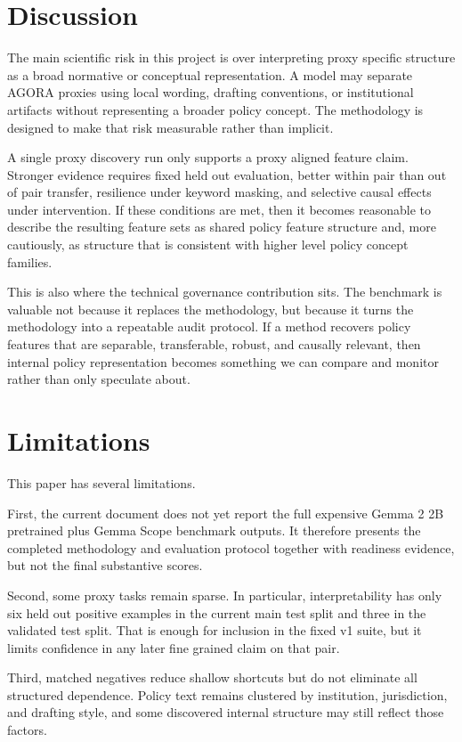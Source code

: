 ﻿\documentclass{article}
\begin{document}
\section{Discussion}
The main scientific risk in this project is over interpreting proxy specific structure as a broad normative or conceptual representation. A model may separate AGORA proxies using local wording, drafting conventions, or institutional artifacts without representing a broader policy concept. The methodology is designed to make that risk measurable rather than implicit.

A single proxy discovery run only supports a proxy aligned feature claim. Stronger evidence requires fixed held out evaluation, better within pair than out of pair transfer, resilience under keyword masking, and selective causal effects under intervention. If these conditions are met, then it becomes reasonable to describe the resulting feature sets as shared policy feature structure and, more cautiously, as structure that is consistent with higher level policy concept families.

This is also where the technical governance contribution sits. The benchmark is valuable not because it replaces the methodology, but because it turns the methodology into a repeatable audit protocol. If a method recovers policy features that are separable, transferable, robust, and causally relevant, then internal policy representation becomes something we can compare and monitor rather than only speculate about.

\section{Limitations}
This paper has several limitations.

First, the current document does not yet report the full expensive Gemma 2 2B pretrained plus Gemma Scope benchmark outputs. It therefore presents the completed methodology and evaluation protocol together with readiness evidence, but not the final substantive scores.

Second, some proxy tasks remain sparse. In particular, interpretability has only six held out positive examples in the current main test split and three in the validated test split. That is enough for inclusion in the fixed v1 suite, but it limits confidence in any later fine grained claim on that pair.

Third, matched negatives reduce shallow shortcuts but do not eliminate all structured dependence. Policy text remains clustered by institution, jurisdiction, and drafting style, and some discovered internal structure may still reflect those factors.
\end{document}
